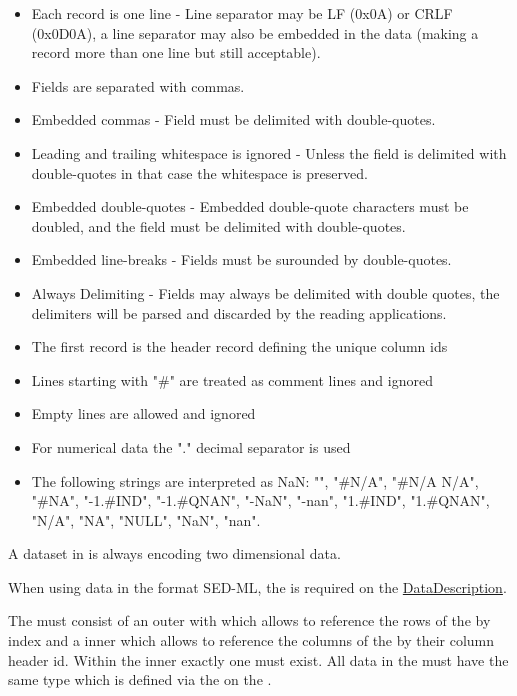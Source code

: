 \begin{itemize}
    \item Each record is one line - Line separator may be LF (0x0A) or CRLF (0x0D0A), a line separator may also be embedded in the data (making a record more than one line but still acceptable).
    \item Fields are separated with commas.
    \item Embedded commas - Field must be delimited with double-quotes.
    \item Leading and trailing whitespace is ignored - Unless the field is delimited with double-quotes in that case the whitespace is preserved.
    \item Embedded double-quotes - Embedded double-quote characters must be doubled, and the field must be delimited with double-quotes.
    \item Embedded line-breaks - Fields must be surounded by double-quotes.
    \item Always Delimiting - Fields may always be delimited with double quotes, the delimiters will be parsed and discarded by the reading applications.
	\item The first record is the header record defining the unique column ids 
	\item Lines starting with "\#" are treated as comment lines and ignored
	\item Empty lines are allowed and ignored
	\item For numerical data the "." decimal separator is used
	\item The following strings are interpreted as NaN: "", "\#N/A", "\#N/A N/A", "\#NA", "-1.\#IND", "-1.\#QNAN", "-NaN", "-nan", "1.\#IND", "1.\#QNAN", "N/A", "NA", "NULL", "NaN", "nan".
\end{itemize}

A dataset in  is always encoding two dimensional data. 

When using data in the  format  SED-ML, the \hyperref[sec:dimensionDescription]{} is required on the \hyperref[class:dataDescription]{DataDescription}. 

The {} must consist of an outer  with  which allows to reference the rows of the  by index and a inner  which allows to reference the columns of the  by their column header id. Within the inner  exactly one  must exist. All data in the  must have the same type  which is defined via the  on the .

